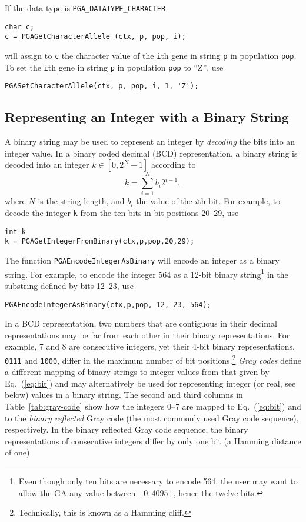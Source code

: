 \documentclass{report}
\begin{document}
If the data type is {\tt PGA\_DATATYPE\_CHARACTER}
\begin{verbatim}
char c;
c = PGAGetCharacterAllele (ctx, p, pop, i);
\end{verbatim}
will assign to {\tt c} the character value of the {\tt i}th gene in string
{\tt p} in population {\tt pop}.  To set the {\tt i}th gene in string {\tt p}
in population {\tt pop} to ``Z'', use
\begin{verbatim}
PGASetCharacterAllele(ctx, p, pop, i, 1, 'Z');
\end{verbatim}


\subsection{Representing an Integer with a Binary String}
\label{subsec:encode-integer}

A binary string may be used to represent an integer by {\em decoding} the
bits into an integer value.  In a binary coded decimal (BCD) representation, a
binary string is decoded into an integer $k
\in [0,2^{N}-1]$ according to
\begin{equation}
k = \sum_{i=1}^{N} b_{i} 2^{i-1},
\label{eq:bit}
\end{equation}
where $N$ is the string length, and $b_i$ the value of the $i$th bit.
For example, to decode the integer {\tt k} from the ten bits in bit positions
20--29, use
\begin{verbatim}
int k
k = PGAGetIntegerFromBinary(ctx,p,pop,20,29);
\end{verbatim}
The function {\tt PGAEncodeIntegerAsBinary} will encode an integer as a binary
string.  For example, to encode the integer 564 as a 12-bit binary
string\footnote{Even though only ten bits are necessary to encode 564, the
user may want to allow the GA any value between $[0,4095]$, hence the twelve
bits.}  in the substring defined by bits 12--23, use
\begin{verbatim}
PGAEncodeIntegerAsBinary(ctx,p,pop, 12, 23, 564);
\end{verbatim}

In a BCD representation, two numbers that are contiguous in their decimal
representations may be far from each other in their binary representations.
For example, 7 and 8 are consecutive integers, yet their 4-bit binary
representations, {\tt 0111} and {\tt 1000}, differ in the maximum number of
bit positions.\footnote{Technically, this is known as a Hamming cliff.}  {\em
Gray codes} define a different mapping of binary strings to integer values
from that given by Eq.~(\ref{eq:bit}) and may alternatively be used for
representing integer (or real, see below) values in a binary string.  The
second and third columns in Table~\ref{tab:gray-code} show how the integers
0--7 are mapped to Eq.~(\ref{eq:bit}) and to the {\em binary reflected} Gray
code (the most commonly used Gray code sequence), respectively.  In the binary
reflected Gray code sequence, the binary representations of consecutive
integers differ  by only one bit (a Hamming distance of one).
\end{document}
